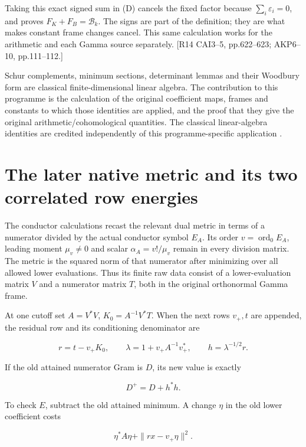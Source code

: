 Taking this exact signed sum in (D) cancels the fixed factor because \(\sum_i\varepsilon_i=0\), and proves \(F_K+F_B=\mathcal B_k\). The signs are part of the definition; they are what makes constant frame changes cancel. This same calculation works for the arithmetic and each Gamma source separately. {[}R14 CAI3--5, pp.622--623; AKP6--10, pp.111--112.{]}

Schur complements, minimum sections, determinant lemmas and their Woodbury form are classical finite-dimensional linear algebra. The contribution to this programme is the calculation of the original coefficient maps, frames and constants to which those identities are applied, and the proof that they give the original arithmetic/cohomological quantities. The classical linear-algebra identities are credited independently of this programme-specific application \cite{BoydElGhaouiFeronBalakrishnan1994,Hager1989Inverse,ShermanMorrison1950Inverse,Woodbury1950Modified}.

\section{The later native metric and its two correlated row energies}\label{the-later-native-metric-and-its-two-correlated-row-energies}

The conductor calculations recast the relevant dual metric in terms of a numerator divided by the actual conductor symbol \(E_A\). Its order \(v=\operatorname{ord}_0E_A\), leading moment \(\mu_v\ne0\) and scalar \(\alpha_A=v!/\mu_v\) remain in every division matrix. The metric is the squared norm of that numerator after minimizing over all allowed lower evaluations. Thus its finite raw data consist of a lower-evaluation matrix \(V\) and a numerator matrix \(T\), both in the original orthonormal Gamma frame.

At one cutoff set \(A=V^*V\), \(K_0=A^{-1}V^*T\). When the next rows \(v_+,t\) are appended, the residual row and its conditioning denominator are

\[
r=t-v_+K_0,\qquad \lambda=1+v_+A^{-1}v_+^*,\qquad
h=\lambda^{-1/2}r.
\]

If the old attained numerator Gram is \(D\), its new value is exactly

\[
D^+=D+h^*h.
\tag{E}
\]

To check \(E\), subtract the old attained minimum. A change \(\eta\) in the old lower coefficient costs

\[
\eta^*A\eta+\|rx-v_+\eta\|^2.
\]

